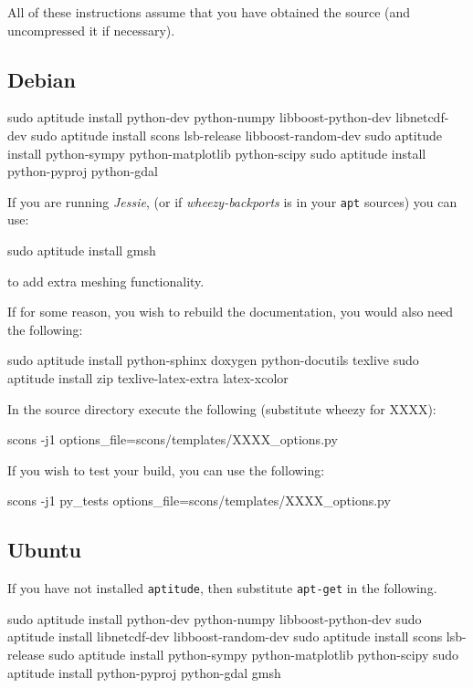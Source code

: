 All of these instructions assume that you have obtained the \escript source (and uncompressed it if necessary).
\subsection{Debian}\label{sec:debsrc}

\begin{shellCode}
sudo aptitude install python-dev python-numpy libboost-python-dev libnetcdf-dev 
sudo aptitude install scons lsb-release  libboost-random-dev
sudo aptitude install python-sympy python-matplotlib python-scipy
sudo aptitude install python-pyproj python-gdal 
\end{shellCode}

\noindent If you are running \textit{Jessie}, (or if \textit{wheezy-backports} is in your \texttt{apt} sources) you can use:
\begin{shellCode}
sudo aptitude install gmsh 
\end{shellCode}
to add extra meshing functionality.

\begin{optionalstep}
If for some reason, you wish to rebuild the documentation, you would also need the following:
\begin{shellCode}
sudo aptitude install python-sphinx doxygen python-docutils texlive 
sudo aptitude install zip texlive-latex-extra latex-xcolor 
\end{shellCode}
\end{optionalstep}

\noindent In the source directory execute the following (substitute wheezy for XXXX):
\begin{shellCode}
scons -j1 options_file=scons/templates/XXXX_options.py
\end{shellCode}

\noindent If you wish to test your build, you can use the following:
\begin{shellCode}
scons -j1 py_tests options_file=scons/templates/XXXX_options.py 
\end{shellCode}

\subsection{Ubuntu}\label{sec:ubsrc}

If you have not installed \texttt{aptitude}, then substitute \texttt{apt-get} in the following.
\begin{shellCode}
sudo aptitude install python-dev python-numpy libboost-python-dev 
sudo aptitude install libnetcdf-dev libboost-random-dev
sudo aptitude install scons lsb-release
sudo aptitude install python-sympy python-matplotlib python-scipy
sudo aptitude install python-pyproj python-gdal gmsh
\end{shellCode}



